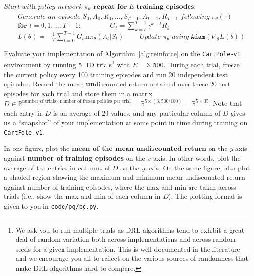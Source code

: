 \documentclass[12pt]{article}
\begin{document}
\begin{algorithm}
\caption{REINFORCE\label{alg:reinforce}}
\begin{algorithmic}[1]
\State $\textit{Start with policy network } \pi_\theta $
\State $\textbf{repeat for $E$ training episodes:}$
\State $\qquad\textit{Generate an episode } S_0, A_0, R_0, \ldots, S_{T-1}, A_{T-1}, R_{T-1} \textit{ following } \pi_\theta(\cdot)$
\State $\qquad\textbf{for } t = 0 , 1 , \dots , T -1$: \label{line:reinforce:1}
\State $\qquad\qquad G_t = \sum_{k=t}^{T-1} \gamma^{k-t} R_{k}$ \label{line:reinforce:2}
\State $\qquad L(\theta) = -\frac{1}{T} \sum_{t=0}^{T-1} G_t \text{ln} \pi_\theta(A_t | S_t)$
\State $\qquad\textit{Update $\pi_\theta$ using } \texttt{Adam}\left(\nabla_\theta L(\theta)\right)$

\EndProcedure
\end{algorithmic}
\end{algorithm}

Evaluate your implementation of Algorithm~\ref{alg:reinforce} on the \texttt{CartPole-v1} environment by running 5 IID trials\footnote{We ask you to run multiple trials as DRL algorithms tend to exhibit a great deal of random variation both across implementations and across random seeds for a given implementation. This is well documented in the literature~\cite{colas2018many} and we encourage you all to reflect on the various sources of randomness that make DRL algorithms hard to compare.} with $E=3,500$. During each trial, freeze the current policy every 100 training episodes and run 20 independent test episodes. Record the mean \textbf{un}discounted return obtained over these 20 test episodes for each trial and store them in a matrix $D\in \mathbb{R}^{\text{number of trials} \times \text{number of frozen policies per trial}} =\mathbb{R}^{5 \times (3,500 / 100)} = \mathbb{R}^{5 \times 35}$. Note that each entry in $D$ is an average of 20 values, and any particular column of $D$ gives us a ``snapshot'' of your implementation at some point in time during training on \texttt{CartPole-v1}.

In one figure, plot the \textbf{mean of the mean undiscounted return} on the $y$-axis against \textbf{number of training episodes} on the $x$-axis. In other words, plot the average of the entries in columns of $D$ on the $y$-axis. On the same figure, also plot a shaded region showing the maximum and minimum mean undiscounted return against number of training episodes, where the max and min are taken across trials (i.e., show the max and min of each column in $D$). The plotting format is given to you in \texttt{code/pg/pg.py}.
\end{document}
